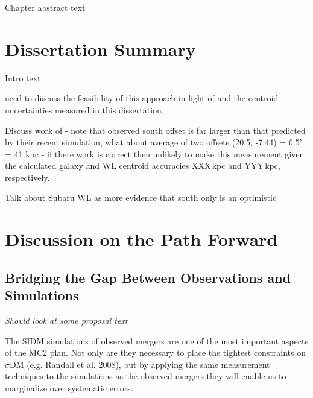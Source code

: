 \label{chapter:5}

Chapter abstract text

\section{Dissertation Summary}

Intro text

need to discuss the feasibility of this approach in light of \citet{Kahlhoefer:2013wp} and the centroid uncertainties measured in this dissertation.

Discuss work of \citep{Kahlhoefer:2013wp}
- note that observed south offset is far larger than that predicted by their recent simulation, what about average of two offsets (20.5, -7.44) = 6.5' = 41 kpc
- if there work is correct then unlikely to make this measurement given the calculated galaxy and WL centroid accuracies XXX\,kpc and YYY\,kpc, respectively.





Talk about Subaru WL as more evidence that south only is an optimistic




\section{Discussion on the Path Forward}

\subsection{Bridging the Gap Between Observations and Simulations}

\textit{Should look at some proposal text}

The SIDM simulations of observed mergers are one of the most important aspects of the MC2 plan.  Not only are they necessary to place the tightest constraints on $\sigma$DM  (e.g. Randall et al. 2008), but by applying the same measurement techniques to the simulations as the observed mergers they will enable us to marginalize over systematic errors.  

